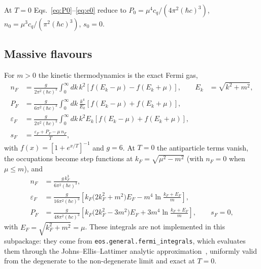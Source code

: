 \documentclass[aps,prc,onecolumn,superscriptaddress,nofootinbib,10pt]{revtex4-2}
\newcommand{\hc}{(\hbar c)^3}
\begin{document}
At $T = 0$ Eqs.~\eqref{eq:P0}--\eqref{eq:e0} reduce to
$P_0 = \mu^4 c_q / (4\pi^2\hc)$, $n_0 = \mu^3 c_q/(\pi^2 \hc)$, $s_0 = 0$.

\subsection{Massive flavours}

For $m > 0$ the kinetic thermodynamics is the exact Fermi gas,
%
\begin{align}
n_F &= \frac{g}{2\pi^2 \hc} \int_0^\infty \! dk\, k^2
       \left[ f(E_k - \mu) - f(E_k + \mu) \right] ,
       & E_k &= \sqrt{k^2 + m^2} ,
\label{eq:nF} \\
P_F &= \frac{g}{6\pi^2 \hc} \int_0^\infty \! dk\, \frac{k^4}{E_k}
       \left[ f(E_k - \mu) + f(E_k + \mu) \right] ,
\label{eq:PF} \\
\varepsilon_F &= \frac{g}{2\pi^2 \hc} \int_0^\infty \! dk\, k^2 E_k
       \left[ f(E_k - \mu) + f(E_k + \mu) \right] ,
\label{eq:eF} \\
s_F &= \frac{\varepsilon_F + P_F - \mu\, n_F}{T} ,
\label{eq:sF}
\end{align}
%
with $f(x) = [1 + e^{x/T}]^{-1}$ and $g = 6$. At $T = 0$ the antiparticle
terms vanish, the occupations become step functions at
$k_F = \sqrt{\mu^2 - m^2}$ (with $n_F = 0$ when $\mu \le m$), and
%
\begin{align}
n_F &= \frac{g\, k_F^3}{6\pi^2 \hc} , \\
\varepsilon_F &= \frac{g}{16 \pi^2 \hc}
   \left[ k_F \big( 2 k_F^2 + m^2 \big) E_F
        - m^4 \ln \frac{k_F + E_F}{m} \right] , \\
P_F &= \frac{g}{48 \pi^2 \hc}
   \left[ k_F \big( 2 k_F^2 - 3 m^2 \big) E_F
        + 3 m^4 \ln \frac{k_F + E_F}{m} \right] ,
\qquad s_F = 0 ,
\end{align}
%
with $E_F = \sqrt{k_F^2 + m^2} = \mu$. These integrals are not implemented in
this subpackage: they come from \texttt{eos.general.fermi\_integrals}, which
evaluates them through the Johns--Ellis--Lattimer analytic
approximation~\cite{JohnsEllisLattimer1996}, uniformly valid from the
degenerate to the non-degenerate limit and exact at $T = 0$.
\end{document}
